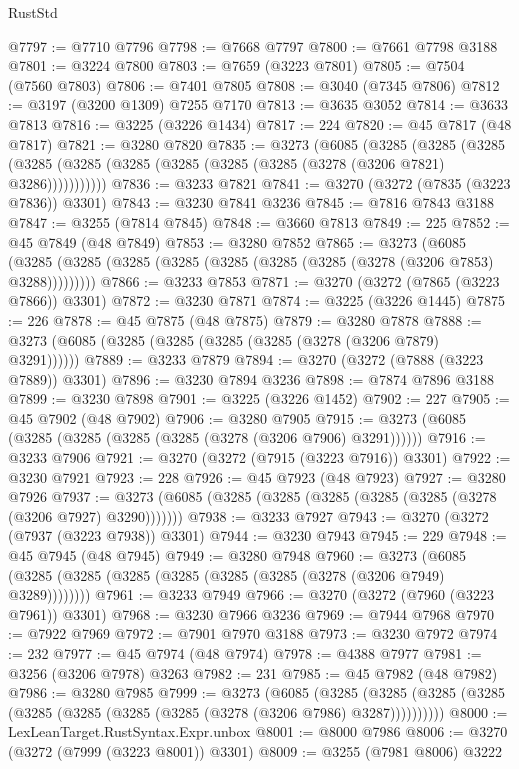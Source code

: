 \begin{lexlean}{RustStd}
\begin{coremodule}
@7797 := @7710 @7796
@7798 := @7668 @7797
@7800 := @7661 @7798 @3188
@7801 := @3224 @7800
@7803 := @7659 (@3223 @7801)
@7805 := @7504 (@7560 @7803)
@7806 := @7401 @7805
@7808 := @3040 (@7345 @7806)
@7812 := @3197 (@3200 @1309) @7255 @7170
@7813 := @3635 @3052
@7814 := @3633 @7813
@7816 := @3225 (@3226 @1434)
@7817 := 224
@7820 := @45 @7817 (@48 @7817)
@7821 := @3280 @7820
@7835 := @3273
    (@6085
      (@3285
        (@3285
          (@3285 (@3285 (@3285 (@3285 (@3285 (@3285 (@3285 (@3278 (@3206 @7821) @3286)))))))))))
@7836 := @3233 @7821
@7841 := @3270 (@3272 (@7835 (@3223 @7836)) @3301)
@7843 := @3230 @7841 @3236
@7845 := @7816 @7843 @3188
@7847 := @3255 (@7814 @7845)
@7848 := @3660 @7813
@7849 := 225
@7852 := @45 @7849 (@48 @7849)
@7853 := @3280 @7852
@7865 := @3273
    (@6085 (@3285 (@3285 (@3285 (@3285 (@3285 (@3285 (@3285 (@3278 (@3206 @7853) @3288)))))))))
@7866 := @3233 @7853
@7871 := @3270 (@3272 (@7865 (@3223 @7866)) @3301)
@7872 := @3230 @7871
@7874 := @3225 (@3226 @1445)
@7875 := 226
@7878 := @45 @7875 (@48 @7875)
@7879 := @3280 @7878
@7888 := @3273 (@6085 (@3285 (@3285 (@3285 (@3285 (@3278 (@3206 @7879) @3291))))))
@7889 := @3233 @7879
@7894 := @3270 (@3272 (@7888 (@3223 @7889)) @3301)
@7896 := @3230 @7894 @3236
@7898 := @7874 @7896 @3188
@7899 := @3230 @7898
@7901 := @3225 (@3226 @1452)
@7902 := 227
@7905 := @45 @7902 (@48 @7902)
@7906 := @3280 @7905
@7915 := @3273 (@6085 (@3285 (@3285 (@3285 (@3285 (@3278 (@3206 @7906) @3291))))))
@7916 := @3233 @7906
@7921 := @3270 (@3272 (@7915 (@3223 @7916)) @3301)
@7922 := @3230 @7921
@7923 := 228
@7926 := @45 @7923 (@48 @7923)
@7927 := @3280 @7926
@7937 := @3273 (@6085 (@3285 (@3285 (@3285 (@3285 (@3285 (@3278 (@3206 @7927) @3290)))))))
@7938 := @3233 @7927
@7943 := @3270 (@3272 (@7937 (@3223 @7938)) @3301)
@7944 := @3230 @7943
@7945 := 229
@7948 := @45 @7945 (@48 @7945)
@7949 := @3280 @7948
@7960 := @3273 (@6085 (@3285 (@3285 (@3285 (@3285 (@3285 (@3285 (@3278 (@3206 @7949) @3289))))))))
@7961 := @3233 @7949
@7966 := @3270 (@3272 (@7960 (@3223 @7961)) @3301)
@7968 := @3230 @7966 @3236
@7969 := @7944 @7968
@7970 := @7922 @7969
@7972 := @7901 @7970 @3188
@7973 := @3230 @7972
@7974 := 232
@7977 := @45 @7974 (@48 @7974)
@7978 := @4388 @7977
@7981 := @3256 (@3206 @7978) @3263
@7982 := 231
@7985 := @45 @7982 (@48 @7982)
@7986 := @3280 @7985
@7999 := @3273
    (@6085
      (@3285 (@3285 (@3285 (@3285 (@3285 (@3285 (@3285 (@3285 (@3278 (@3206 @7986) @3287))))))))))
@8000 := LexLeanTarget.RustSyntax.Expr.unbox
@8001 := @8000 @7986
@8006 := @3270 (@3272 (@7999 (@3223 @8001)) @3301)
@8009 := @3255 (@7981 @8006) @3222

\end{coremodule}
\end{lexlean}

